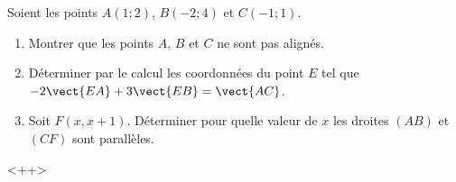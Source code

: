 
\begin{exercice}\label{exosmath-0664}

    Soient les points \( A(1;2)\), \( B(-2;4)\) et \( C(-1;1)\).
    \begin{enumerate}
        \item
            Montrer que les points \( A\), \( B\) et \( C\) ne sont pas alignés.
        \item
            Déterminer par le calcul les coordonnées du point \( E\) tel que \( -2\vect{ EA }+3\vect{ EB }=\vect{ AC }\).
        \item
            Soit \( F(x,x+1)\). Déterminer pour quelle valeur de \( x\) les droites \( (AB)\) et \( (CF)\) sont parallèles.
    \end{enumerate}
    <++>

\end{exercice}
